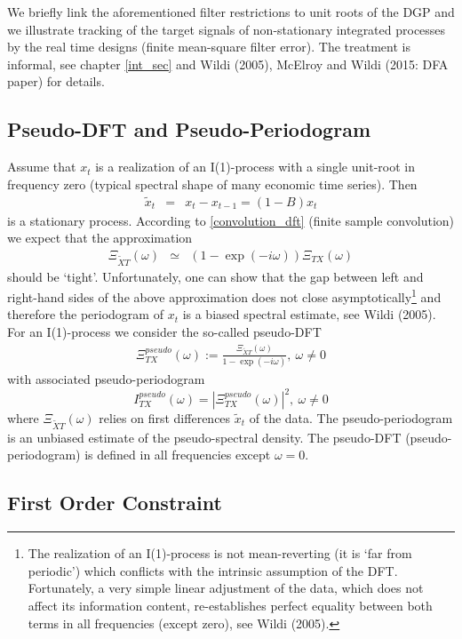 \documentclass[a4paper]{book}
\begin{document}
We briefly link the aforementioned filter restrictions to unit roots of the DGP and we illustrate tracking of the target signals of non-stationary integrated processes by the real time designs (finite mean-square filter error). The treatment is informal, see chapter \ref{int_sec} and Wildi (2005), McElroy and Wildi (2015: DFA paper) for details.

\subsection{Pseudo-DFT and Pseudo-Periodogram}

 Assume that $x_t$ is a realization of an I(1)-process with a single unit-root in frequency zero (typical spectral shape of many economic time series). Then 
\begin{eqnarray*}
\tilde{x}_t&=&x_{t}-x_{t-1}=(1-B)x_t
\end{eqnarray*}
is a stationary process. According to \ref{convolution_dft} (finite sample convolution) we expect that the approximation
\begin{eqnarray*}
\Xi_{\tilde{X}T}(\omega)&\simeq&(1-\exp(-i\omega))\Xi_{TX}(\omega)
\end{eqnarray*}
should be `tight'. Unfortunately, one can show that the gap between left and right-hand sides of the above approximation does not close asymptotically\footnote{The realization of an I(1)-process is not mean-reverting (it is `far from periodic') which conflicts with the intrinsic assumption of the DFT. Fortunately, a very simple linear adjustment of the data, which does not affect its information content, re-establishes perfect equality between both terms in all frequencies (except zero), see Wildi (2005).} and therefore the periodogram of $x_t$ is a biased spectral estimate, see Wildi (2005). For an I(1)-process we consider the so-called pseudo-DFT
\begin{eqnarray*}
\Xi_{TX}^{pseudo}(\omega):=\frac{\Xi_{\tilde{X}T}(\omega)}{1-\exp(-i\omega)},~\omega\neq 0
\end{eqnarray*}
with associated pseudo-periodogram
\[I_{TX}^{pseudo}(\omega)=\left|\Xi_{TX}^{pseudo}(\omega)\right|^2,~\omega\neq 0\]
where $\Xi_{\tilde{X}T}(\omega)$ relies on first differences $\tilde{x}_t$ of the data. The pseudo-periodogram is an unbiased estimate of the pseudo-spectral density. The pseudo-DFT (pseudo-periodogram) is defined in all frequencies except $\omega=0$. 



\subsection{First Order Constraint}\label{first_order_cons}
\end{document}
